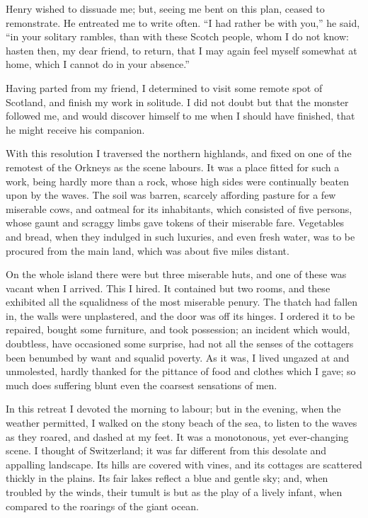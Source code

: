Henry wished to dissuade me; but,
seeing me bent on this plan, ceased to
remonstrate. He entreated me to write
often. ``I had rather be with you,''
he said, ``in your solitary rambles,
than with these Scotch people, whom
I do not know: hasten then, my dear
friend, to return, that I may again feel
myself somewhat at home, which I
cannot do in your absence.''

Having parted from my friend, I
determined to visit some remote spot
of Scotland, and finish my work in solitude.
I did not doubt but that the
monster followed me, and would discover
himself to me when I should
have finished, that he might receive his
companion.

With this resolution I traversed the
northern highlands, and fixed on one of
the remotest of the Orkneys as the
scene labours. It was a place fitted for
such a work, being hardly more than a
rock, whose high sides were continually
beaten upon by the waves. The soil
was barren, scarcely affording pasture
for a few miserable cows, and oatmeal
for its inhabitants, which consisted of
five persons, whose gaunt and scraggy
limbs gave tokens of their miserable
fare. Vegetables and bread, when they
indulged in such luxuries, and even
fresh water, was to be procured from
the main land, which was about five
miles distant.

On the whole island there were but
three miserable huts, and one of these
was vacant when I arrived. This I
hired. It contained but two rooms, and
these exhibited all the squalidness of
the most miserable penury. The thatch
had fallen in, the walls were unplastered,
and the door was off its hinges.
I ordered it to be repaired, bought
some furniture, and took possession;
an incident which would, doubtless,
have occasioned some surprise, had not
all the senses of the cottagers been benumbed
by want and squalid poverty.
As it was, I lived ungazed at and unmolested,
hardly thanked for the pittance
of food and clothes which I gave; so
much does suffering blunt even the
coarsest sensations of men.

In this retreat I devoted the morning
to labour; but in the evening, when the
weather permitted, I walked on the
stony beach of the sea, to listen to the
waves as they roared, and dashed at
my feet. It was a monotonous, yet
ever-changing scene. I thought of
Switzerland; it was far different from
this desolate and appalling landscape.
Its hills are covered with vines, and its
cottages are scattered thickly in the
plains. Its fair lakes reflect a blue and
gentle sky; and, when troubled by the
winds, their tumult is but as the play
of a lively infant, when compared to the
roarings of the giant ocean.

